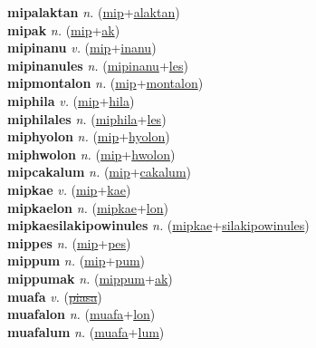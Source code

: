 \textbf{mipalaktan} \textit{n.} (\hyperref[mip]{mip}+\hyperref[alaktan]{alaktan})
 \label{mipalaktan} \\
\textbf{mipak} \textit{n.} (\hyperref[mip]{mip}+\hyperref[ak]{ak})
 \label{mipak} \\
\textbf{mipinanu} \textit{v.} (\hyperref[mip]{mip}+\hyperref[inanu]{inanu})
 \label{mipinanu} \\
\textbf{mipinanules} \textit{n.} (\hyperref[mipinanu]{mipinanu}+\hyperref[les]{les})
 \label{mipinanules} \\
\textbf{mipmontalon} \textit{n.} (\hyperref[mip]{mip}+\hyperref[montalon]{montalon})
 \label{mipmontalon} \\
\textbf{miphila} \textit{v.} (\hyperref[mip]{mip}+\hyperref[hila]{hila})
 \label{miphila} \\
\textbf{miphilales} \textit{n.} (\hyperref[miphila]{miphila}+\hyperref[les]{les})
 \label{miphilales} \\
\textbf{miphyolon} \textit{n.} (\hyperref[mip]{mip}+\hyperref[hyolon]{hyolon})
 \label{miphyolon} \\
\textbf{miphwolon} \textit{n.} (\hyperref[mip]{mip}+\hyperref[hwolon]{hwolon})
 \label{miphwolon} \\
\textbf{mipcakalum} \textit{n.} (\hyperref[mip]{mip}+\hyperref[cakalum]{cakalum})
 \label{mipcakalum} \\
\textbf{mipkae} \textit{v.} (\hyperref[mip]{mip}+\hyperref[kae]{kae})
 \label{mipkae} \\
\textbf{mipkaelon} \textit{n.} (\hyperref[mipkae]{mipkae}+\hyperref[lon]{lon})
 \label{mipkaelon} \\
\textbf{mipkaesilakipowinules} \textit{n.} (\hyperref[mipkae]{mipkae}+\hyperref[silakipowinules]{silakipowinules})
 \label{mipkaesilakipowinules} \\
\textbf{mippes} \textit{n.} (\hyperref[mip]{mip}+\hyperref[pes]{pes})
 \label{mippes} \\
\textbf{mippum} \textit{n.} (\hyperref[mip]{mip}+\hyperref[pum]{pum})
 \label{mippum} \\
\textbf{mippumak} \textit{n.} (\hyperref[mippum]{mippum}+\hyperref[ak]{ak})
 \label{mippumak} \\
\textbf{muafa} \textit{v.} (\hyperref[piasa]{\sout{piasa}})
 \label{muafa} \\
\textbf{muafalon} \textit{n.} (\hyperref[muafa]{muafa}+\hyperref[lon]{lon})
 \label{muafalon} \\
\textbf{muafalum} \textit{n.} (\hyperref[muafa]{muafa}+\hyperref[lum]{lum})
 \label{muafalum} \\
